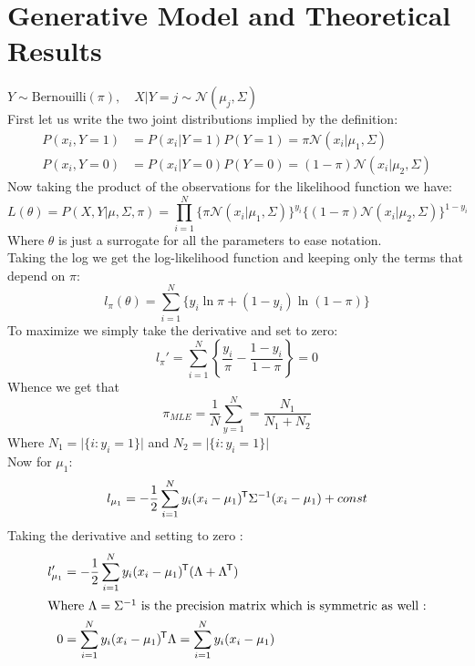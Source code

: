 


\newcommand{\No}{\mathcal{N}}
\graphicspath{{figures/}}

\tableofcontents
\newpage


\section{Generative Model and Theoretical Results}
$Y \sim \mathrm{Bernouilli}(\pi), \quad X\vert Y = j \sim \mathcal N (\mu_j,
\Sigma)$\\[1ex] First let us write the two joint distributions implied by the
definition:
\begin{align*}
    P(x_i, Y = 1) &= P(x_i \vert Y = 1)P(Y=1) = \pi\No(x_i \vert \mu_1, \Sigma)\\
    P(x_i ,Y = 0) &= P(x_i \vert Y = 0)P(Y=0) = (1-\pi) \No (x_i \vert \mu_2, \Sigma)
\end{align*}
Now taking the product of the observations for the likelihood function we have:
\begin{equation}
    L(\theta) =  P(X, Y \vert \mu, \Sigma , \pi) = \prod_{i=1}^{N}
    	\{\pi\No (x_i \vert \mu_1, \Sigma)\}^{y_i}
	\{(1-\pi)\No (x_i \vert \mu_2, \Sigma)\}^{1-y_i}
\end{equation}
Where $\theta$ is just a surrogate for all the parameters to ease notation.\\
Taking the log we get the log-likelihood function and keeping only the terms 
that depend on $\pi$:
\begin{equation}
l_\pi (\theta) = \sum_{i=1}^{N}\{y_i\ln \pi + (1-y_i)\ln (1-\pi) \}
\end{equation}
To maximize we simply take the derivative and set to zero:
\begin{equation}
l_\pi ' = \sum_{i=1}^{N}\left \{\frac{y_i}{\pi}  - \frac{1-y_i}{1-\pi}\right \}  = 0
\end{equation}
Whence we get that 
\begin{equation}
\pi_{MLE} = \frac{1}{N}\sum_{y=1}^N = \frac{N_1}{N_1 + N_2}
\end{equation}
Where $N_1 = \vert \{i : y_i = 1\}\vert$ and $N_2 = \vert \{i : y_i = 1\}\vert$\\
Now for $\mu_1$:
\begin{equation}
    l_{\mu_1} = -\frac{1}{2}\sum_{i=1}^N y_i (x_i - \mu_1)^{\mkern-1.5mu\mathsf{T}} \Sigma^{-1}(x_i
    - \mu_1) + const 
\end{equation}
%
Taking the derivative and setting to zero :
\begin{align*}
    l_{\mu_1}' &= -\frac{1}{2} \sum_{i=1}^N y_i (x_i-\mu_1)^{\mkern-1.5mu\mathsf{T}}(\Lambda + \Lambda^{\mkern-1.5mu\mathsf{T}})\\
    \intertext{Where $\Lambda = \Sigma^{-1}$ is the precision matrix which is symmetric
    as well :}
    0 &= \sum_{i=1}^N y_i (x_i-\mu_1)^{\mkern-1.5mu\mathsf{T}} \Lambda 
        =\sum_{i=1}^N y_i (x_i-\mu_1)
\end{align*}
